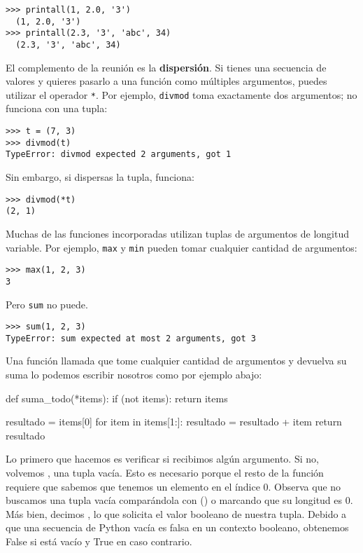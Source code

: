 \begin{Verbatim}[frame=single]
>>> printall(1, 2.0, '3')
  (1, 2.0, '3')
>>> printall(2.3, '3', 'abc', 34)
  (2.3, '3', 'abc', 34)
\end{Verbatim}
%
El complemento de la reunión es la \textbf{dispersión}.  Si tienes una
secuencia de valores y quieres pasarlo a una función
como múltiples argumentos, puedes utilizar el operador \texttt{*}.
Por ejemplo, \texttt{divmod} toma exactamente dos argumentos;
no funciona con una tupla:

\begin{Verbatim}[frame=single]
>>> t = (7, 3)
>>> divmod(t)
TypeError: divmod expected 2 arguments, got 1
\end{Verbatim}
%
Sin embargo, si dispersas la tupla, funciona:

\begin{Verbatim}[frame=single]
>>> divmod(*t)
(2, 1)
\end{Verbatim}
%
Muchas de las funciones incorporadas utilizan
tuplas de argumentos de longitud variable.  Por ejemplo, \texttt{max}
y \texttt{min} pueden tomar cualquier cantidad de argumentos:

\begin{Verbatim}[frame=single]
>>> max(1, 2, 3)
3
\end{Verbatim}
%
Pero \texttt{sum} no puede.

\begin{Verbatim}[frame=single]
>>> sum(1, 2, 3)
TypeError: sum expected at most 2 arguments, got 3
\end{Verbatim}
%
Una función llamada que tome cualquier cantidad de argumentos y devuelva su suma lo podemos escribir nosotros como por ejemplo abajo:

\begin{python}
def suma_todo(*items):
    if (not items):
        return items
    
    resultado = items[0]
    for item in items[1:]:
        resultado = resultado + item
    return resultado
\end{python}


Lo primero que hacemos es verificar si recibimos algún argumento. Si no, volvemos
, una tupla vacía. Esto es necesario porque el resto de la función requiere que
sabemos que tenemos un elemento en el índice 0. Observa que no buscamos una tupla vacía comparándola con () o marcando
que su longitud es 0. Más bien, decimos 
, lo que solicita el valor booleano de nuestra tupla. Debido a que una secuencia de Python vacía es falsa en un contexto booleano, obtenemos
False si  está vacío y True en caso contrario.
\newpage

